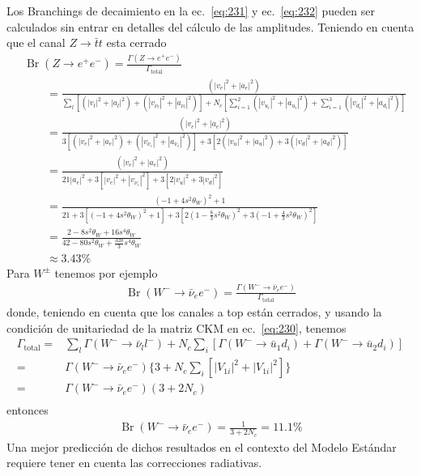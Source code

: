 Los Branchings de decaimiento en la ec.~\eqref{eq:231} y ec.~\eqref{eq:232}  pueden ser calculados sin entrar en detalles del c\'alculo de las amplitudes. Teniendo en cuenta que el canal $Z\to\bar{t}t$ esta cerrado
\begin{align}
  &\operatorname{Br}(Z\to e^+e^-)=\frac{\Gamma(Z\to e^+e^-)}{\Gamma_{\text{total}}}\nonumber\\
 &\qquad=\frac{(|v_e|^2+|a_e|^2)}{\sum_l[(|v_l|^2+|a_l|^2)+(|v_{\nu_l}|^2+|a_{\nu_l}|^2)]
+N_c[\sum_{i=1}^2(|v_{u_i}|^2+|a_{u_i}|^2)+\sum_{i=1}^3(|v_{d_i}|^2+|a_{d_i}|^2)]}\nonumber\\
 &\qquad=\frac{(|v_e|^2+|a_e|^2)}{3[(|v_e|^2+|a_e|^2)+(|v_{\nu_e}|^2+|a_{\nu_e}|^2)]
+3[2(|v_{u}|^2+|a_{u}|^2)+3(|v_{d}|^2+|a_{d}|^2)]}\nonumber\\
  &\qquad=\frac{(|v_e|^2+|a_e|^2)}{21|a_e|^2+3[|v_e|^2+|v_{\nu_e}|^2]
+3[2|v_{u}|^2+3|v_{d}|^2]}\nonumber\\
 &\qquad=\frac{(-1+4s^2\theta_W)^2+1}{21+3[(-1+4s^2\theta_W)^2+1]
+3[2(1-\frac{8}{3}s^2\theta_W)^2+3(-1+\frac{4}{3}s^2\theta_W)^2]}\nonumber\\
  &\qquad=\frac{2-8s^2\theta_W+16s^4\theta_W}{42-80s^2\theta_W+\frac{320}{3}s^4\theta_W}\nonumber\\
&\qquad\approx3.43\%
\end{align}
Para $W^\pm$ tenemos por ejemplo
\begin{align}
\operatorname{Br}(W^-\to\bar{\nu}_e e^-)=\frac{\Gamma(W^-\to\bar{\nu}_e e^-)}{\Gamma_{\text{total}}}
\end{align}
donde, teniendo en cuenta que los canales a top est\'an cerrados, y usando la condici\'on de unitariedad de la matriz CKM en ec.~\eqref{eq:230}, tenemos
\begin{align}
  \Gamma_{\text{total}}=&\sum_l\Gamma(W^-\to\bar{\nu}_l l^-)+N_c\sum_i[\Gamma(W^-\to\bar{u}_1d_i)+\Gamma(W^-\to\bar{u}_2d_i)]\nonumber\\
  =&\Gamma(W^-\to\bar{\nu}_e e^-)\{3+N_c\sum_i[|V_{1i}|^2+|V_{1i}|^2]\} \nonumber\\
  =&\Gamma(W^-\to\bar{\nu}_e e^-)(3+2N_c) \nonumber\\
\end{align}
entonces
\begin{align}
  \operatorname{Br}(W^-\to\bar{\nu}_e e^-)=\frac{1}{3+2N_c}=11.1\%
\end{align}
Una mejor predicci\'on de dichos resultados en el contexto del Modelo Est\'andar requiere tener en cuenta las correcciones radiativas.

